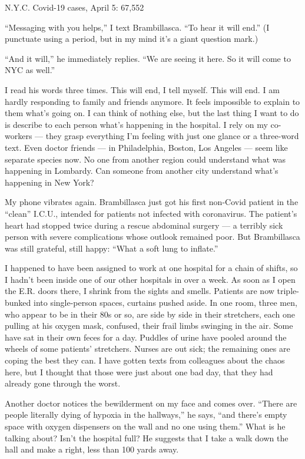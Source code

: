 N.Y.C. Covid-19 cases, April 5: 67,552

``Messaging with you helps,'' I text Brambillasca. ``To hear it will
end.'' (I punctuate using a period, but in my mind it's a giant question
mark.)

``And it will,'' he immediately replies. ``We are seeing it here. So it
will come to NYC as well.''

I read his words three times. This will end, I tell myself. This will
end. I am hardly responding to family and friends anymore. It feels
impossible to explain to them what's going on. I can think of nothing
else, but the last thing I want to do is describe to each person what's
happening in the hospital. I rely on my co-workers --- they grasp
everything I'm feeling with just one glance or a three-word text. Even
doctor friends --- in Philadelphia, Boston, Los Angeles --- seem like
separate species now. No one from another region could understand what
was happening in Lombardy. Can someone from another city understand
what's happening in New York?

My phone vibrates again. Brambillasca just got his first non-Covid
patient in the ``clean'' I.C.U., intended for patients not infected with
coronavirus. The patient's heart had stopped twice during a rescue
abdominal surgery --- a terribly sick person with severe complications
whose outlook remained poor. But Brambillasca was still grateful, still
happy: ``What a soft lung to inflate.''

I happened to have been assigned to work at one hospital for a chain of
shifts, so I hadn't been inside one of our other hospitals in over a
week. As soon as I open the E.R. doors there, I shrink from the sights
and smells. Patients are now triple-bunked into single-person spaces,
curtains pushed aside. In one room, three men, who appear to be in their
80s or so, are side by side in their stretchers, each one pulling at his
oxygen mask, confused, their frail limbs swinging in the air. Some have
sat in their own feces for a day. Puddles of urine have pooled around
the wheels of some patients' stretchers. Nurses are out sick; the
remaining ones are coping the best they can. I have gotten texts from
colleagues about the chaos here, but I thought that those were just
about one bad day, that they had already gone through the worst.

Another doctor notices the bewilderment on my face and comes over.
``There are people literally dying of hypoxia in the hallways,'' he
says, ``and there's empty space with oxygen dispensers on the wall and
no one using them.'' What is he talking about? Isn't the hospital full?
He suggests that I take a walk down the hall and make a right, less than
100 yards away.

